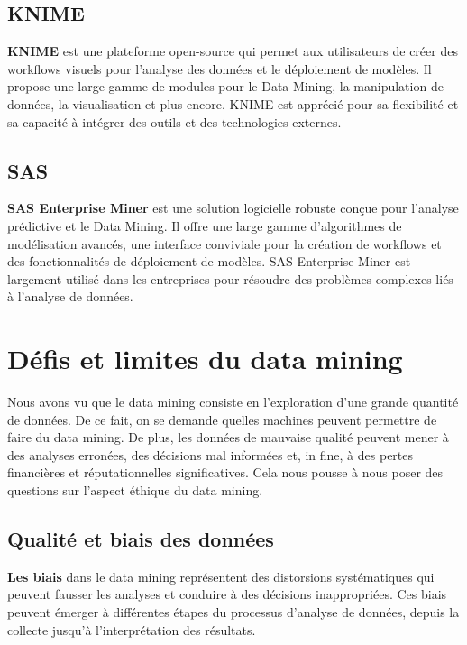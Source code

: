 \documentclass[a4paper,12pt]{report}
\begin{document}
    
    \section{KNIME}
    \textbf{KNIME} est une plateforme open-source qui permet aux utilisateurs de créer des workflows visuels pour l’analyse des données et le déploiement de modèles. Il propose une large gamme de modules pour le Data Mining, la manipulation de données, la visualisation et plus encore. KNIME est apprécié pour sa flexibilité et sa capacité à intégrer des outils et des technologies externes.
    
    \section{SAS}
    \textbf{SAS Enterprise Miner} est une solution logicielle robuste conçue pour l’analyse prédictive et le Data Mining. Il offre une large gamme d’algorithmes de modélisation avancés, une interface conviviale pour la création de workflows et des fonctionnalités de déploiement de modèles. SAS Enterprise Miner est largement utilisé dans les entreprises pour résoudre des problèmes complexes liés à l’analyse de données.




\chapter{Défis et limites du data mining}
	Nous avons vu que le data mining consiste en l’exploration d’une grande quantité de données. De ce fait, on se demande quelles machines peuvent permettre de faire du data mining. De plus, les données de mauvaise qualité peuvent mener à des analyses erronées, des décisions mal informées et, in fine, à des pertes financières et réputationnelles significatives. Cela nous pousse à nous poser des questions sur l’aspect éthique du data mining. 

	\section{Qualité et biais des données}
	    \textbf{Les biais} dans le data mining représentent des distorsions systématiques qui peuvent fausser les analyses et conduire à des décisions inappropriées. Ces biais peuvent émerger à différentes étapes du processus d'analyse de données, depuis la collecte jusqu'à l'interprétation des résultats.
\end{document}
